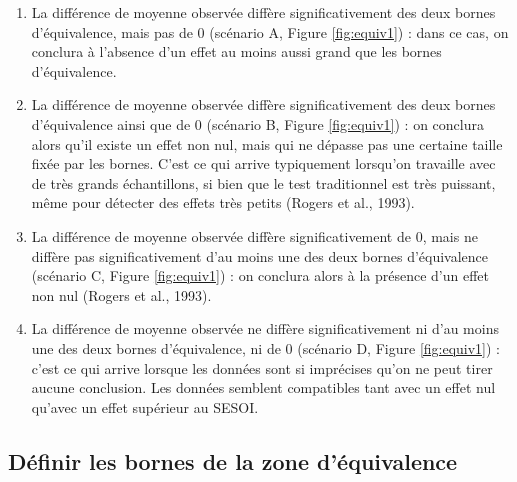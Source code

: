 \documentclass[
  english,
  man]{apa6}
\begin{document}
\begin{enumerate}
\def\labelenumi{(\arabic{enumi})}
\item
  La différence de moyenne observée diffère significativement des deux bornes d'équivalence, mais pas de 0 (scénario A, Figure \ref{fig:equiv1}) : dans ce cas, on conclura à l'absence d'un effet au moins aussi grand que les bornes d'équivalence.
\item
  La différence de moyenne observée diffère significativement des deux bornes d'équivalence ainsi que de 0 (scénario B, Figure \ref{fig:equiv1}) : on conclura alors qu'il existe un effet non nul, mais qui ne dépasse pas une certaine taille fixée par les bornes. C'est ce qui arrive typiquement lorsqu'on travaille avec de très grands échantillons, si bien que le test traditionnel est très puissant, même pour détecter des effets très petits (Rogers et al., 1993).
\item
  La différence de moyenne observée diffère significativement de 0, mais ne diffère pas significativement d'au moins une des deux bornes d'équivalence (scénario C, Figure \ref{fig:equiv1}) : on conclura alors à la présence d'un effet non nul (Rogers et al., 1993).
\item
  La différence de moyenne observée ne diffère significativement ni d'au moins une des deux bornes d'équivalence, ni de 0 (scénario D, Figure \ref{fig:equiv1}) : c'est ce qui arrive lorsque les données sont si imprécises qu'on ne peut tirer aucune conclusion. Les données semblent compatibles tant avec un effet nul qu'avec un effet supérieur au SESOI.
\end{enumerate}

\hypertarget{duxe9finir-les-bornes-de-la-zone-duxe9quivalence}{%
\subsection{Définir les bornes de la zone d'équivalence}\label{duxe9finir-les-bornes-de-la-zone-duxe9quivalence}}
\end{document}
